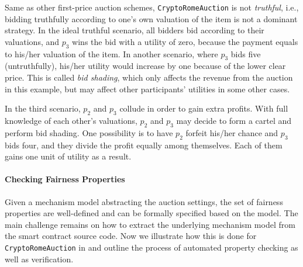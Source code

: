 Same as other first-price auction schemes, \texttt{CryptoRomeAuction} is not \emph{truthful}, i.e.,
bidding truthfully according to one's own valuation of the item is not a dominant strategy.
In the ideal truthful scenario, all bidders bid according to their valuations, and $p_3$ wins the
bid with a utility of zero, because the payment equals to his/her valuation of the item.
In another scenario, where $p_3$ bids five (untruthfully), his/her utility would increase by one because
of the lower clear price.
This is called \emph{bid shading}, which only affects the revenue from the auction in this example,
but may affect other participants' utilities in some other cases.

In the third scenario, $p_2$ and $p_3$ collude in order to gain extra profits.
With full knowledge of each other's valuations, $p_2$ and $p_3$ may decide to form a cartel and
perform bid shading.
One possibility is to have $p_2$ forfeit his/her chance and $p_3$ bids four, and they divide the
profit equally among themselves.
Each of them gains one unit of utility as a result.


\paragraph{Checking Fairness Properties}
Given a mechanism model abstracting the auction settings, the set of fairness properties are
well-defined and can be formally specified based on the model.
The main challenge remains on how to extract the underlying mechanism model from the smart contract
source code.
Now we illustrate how this is done for \texttt{CryptoRomeAuction} in \faircon and outline the process
of automated property checking as well as verification.


